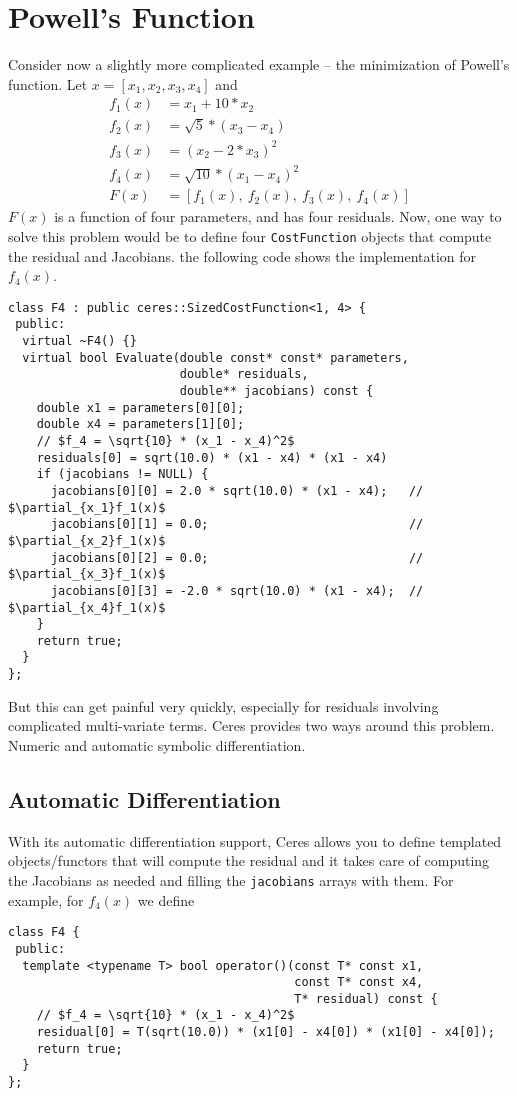 \chapter{Powell's Function}
\label{chapter:tutorial:powell}
Consider now a slightly more complicated example -- the minimization of Powell's function. Let $x = \left[x_1, x_2, x_3, x_4 \right]$ and
\begin{align}
   f_1(x) &= x_1 + 10*x_2 \\
   f_2(x) &= \sqrt{5} * (x_3 - x_4)\\
   f_3(x) &= (x_2 - 2*x_3)^2\\
   f_4(x) &= \sqrt{10} * (x_1 - x_4)^2\\
	F(x) & = \left[f_1(x),\ f_2(x),\ f_3(x),\ f_4(x) \right]
\end{align}
$F(x)$ is a function of four parameters, and has four residuals. Now,
one way to solve this problem would be to define four
\texttt{CostFunction} objects that compute the residual and Jacobians. \eg the following code shows the implementation for $f_4(x)$.
\begin{verbatim}
class F4 : public ceres::SizedCostFunction<1, 4> {
 public:
  virtual ~F4() {}
  virtual bool Evaluate(double const* const* parameters,
                        double* residuals,
                        double** jacobians) const {
    double x1 = parameters[0][0];
    double x4 = parameters[1][0];
    // $f_4 = \sqrt{10} * (x_1 - x_4)^2$
    residuals[0] = sqrt(10.0) * (x1 - x4) * (x1 - x4)
    if (jacobians != NULL) {
      jacobians[0][0] = 2.0 * sqrt(10.0) * (x1 - x4);   // $\partial_{x_1}f_1(x)$
      jacobians[0][1] = 0.0;                            // $\partial_{x_2}f_1(x)$
      jacobians[0][2] = 0.0;                            // $\partial_{x_3}f_1(x)$
      jacobians[0][3] = -2.0 * sqrt(10.0) * (x1 - x4);  // $\partial_{x_4}f_1(x)$
    }
    return true;
  }
};
\end{verbatim}

But this can get painful very quickly, especially for residuals involving complicated multi-variate terms. Ceres provides two ways around this problem. Numeric and automatic symbolic differentiation.

\section{Automatic Differentiation}
\label{sec:tutorial:autodiff}
With its automatic differentiation support, Ceres allows you to define templated objects/functors that will compute the residual and it takes care of computing the Jacobians as needed and filling the \texttt{jacobians} arrays with them. For example, for $f_4(x)$ we define
\begin{verbatim}
class F4 {
 public:
  template <typename T> bool operator()(const T* const x1,
                                        const T* const x4,
                                        T* residual) const {
    // $f_4 = \sqrt{10} * (x_1 - x_4)^2$
    residual[0] = T(sqrt(10.0)) * (x1[0] - x4[0]) * (x1[0] - x4[0]);
    return true;
  }
};
\end{verbatim}


